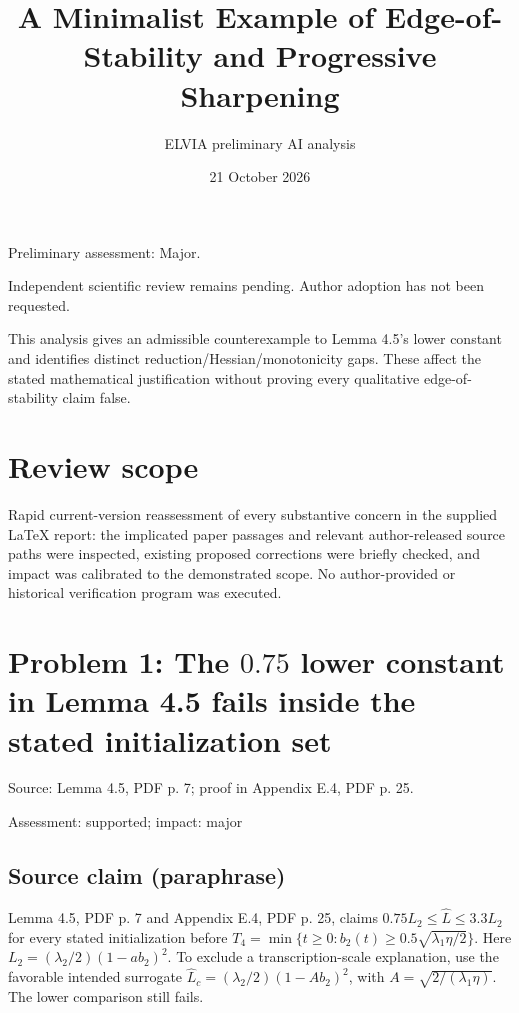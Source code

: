 \documentclass[11pt]{article}
\begin{document}
\title{A Minimalist Example of Edge-of-Stability and Progressive Sharpening}

\author{ELVIA preliminary AI analysis}\date{21 October 2026}\maketitle

Preliminary assessment: Major.\par

Independent scientific review remains pending. Author adoption has not been requested.

This analysis gives an admissible counterexample to Lemma 4.5's lower constant and identifies distinct reduction/Hessian/monotonicity gaps. These affect the stated mathematical justification without proving every qualitative edge-of-stability claim false.

\section*{Review scope}

Rapid current-version reassessment of every substantive concern in the supplied LaTeX report: the implicated paper passages and relevant author-released source paths were inspected, existing proposed corrections were briefly checked, and impact was calibrated to the demonstrated scope. No author-provided or historical verification program was executed.

\section*{Problem 1: The \(0.75\) lower constant in Lemma 4.5 fails inside the stated initialization set}

Source: Lemma 4.5, PDF p. 7; proof in Appendix E.4, PDF p. 25.

Assessment: supported; impact: major

\subsection*{Source claim (paraphrase)}

Lemma 4.5, PDF p. 7 and Appendix E.4, PDF p. 25, claims \(0.75L_2\le\widehat L\le3.3L_2\) for every stated initialization before \(T_4=\min\{t\ge0:b_2(t)\ge0.5\sqrt{\lambda_1\eta/2}\}\). Here \(L_2=(\lambda_2/2)(1-ab_2)^2\). To exclude a transcription-scale explanation, use the favorable intended surrogate \(\widehat L_c=(\lambda_2/2)(1-Ab_2)^2\), with \(A=\sqrt{2/(\lambda_1\eta)}\). The lower comparison still fails.
\end{document}
